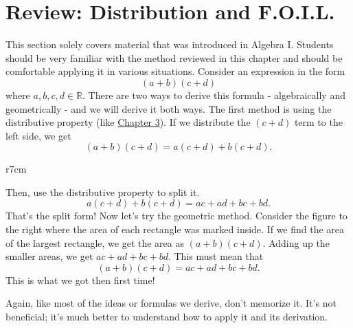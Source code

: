 \documentclass[../book.tex]{subfiles}
\begin{document}
\section{Review: Distribution and F.O.I.L.}
\noindent This section solely covers material that was introduced in Algebra I.  Students should be very familiar with the method reviewed in this chapter and should be comfortable applying it in various situations.  Consider an expression in the form $$(a+b)(c+d)$$ where $a,b,c,d\in\mathbb{R}$.  There are two ways to derive this formula - algebraically and geometrically - and we will derive it both ways.  The first method is using the distributive property (like \hyperlink{chapter.3}{Chapter 3}).  If we distribute the $(c+d)$ term to the left side, we get $$(a+b)(c+d)=a(c+d)+b(c+d).$$  

\begin{wrapfigure}{r}{7cm}
    \centering
{}
\end{wrapfigure}

Then, use the distributive property to split it.  $$a(c+d)+b(c+d)=ac+ad+bc+bd.$$  That's the split form!  Now let's try the geometric method.  Consider the figure to the right where the area of each rectangle was marked inside.  If we find the area of the largest rectangle, we get the area as $(a+b)(c+d)$.  Adding up the smaller areas, we get $ac+ad+bc+bd$.  This must mean that $$(a+b)(c+d)=ac+ad+bc+bd.$$  This is what we got then first time!

\begin{remark}
Again, like most of the ideas or formulas we derive, don't memorize it.  It's not beneficial; it's much better to understand how to apply it and its derivation.
\end{remark}
\end{document}
